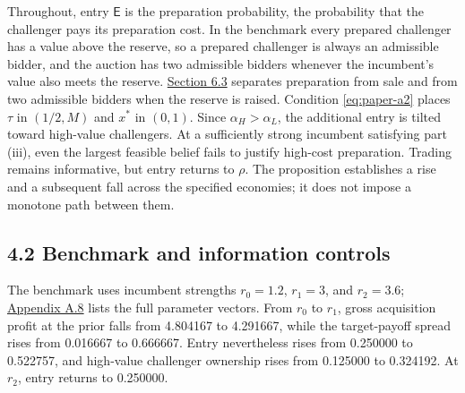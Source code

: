\documentclass[
  12pt,
]{article}
\begin{document}
Throughout, entry \(\mathsf E\) is the preparation probability, the
probability that the challenger pays its preparation cost. In the
benchmark every prepared challenger has a value above the reserve, so a
prepared challenger is always an admissible bidder, and the auction has
two admissible bidders whenever the incumbent's value also meets the
reserve. \hyperref[sec-design]{Section 6.3} separates preparation from
sale and from two admissible bidders when the reserve is raised.
Condition \eqref{eq:paper-a2} places \(\tau\) in \((1/2,M)\) and \(x^*\)
in \((0,1)\). Since \(\alpha_H>\alpha_L\), the additional entry is
tilted toward high-value challengers. At a sufficiently strong incumbent
satisfying part (iii), even the largest feasible belief fails to justify
high-cost preparation. Trading remains informative, but entry returns to
\(\rho\). The proposition establishes a rise and a subsequent fall
across the specified economies; it does not impose a monotone path
between them.

\subsection{4.2 Benchmark and information
controls}\label{sec-benchmark-and-information-controls}

The benchmark uses incumbent strengths \(r_0=1.2\), \(r_1=3\), and
\(r_2=3.6\); \hyperref[pa-parameters]{Appendix A.8} lists the full
parameter vectors. From \(r_0\) to \(r_1\), gross acquisition profit at
the prior falls from 4.804167 to 4.291667, while the target-payoff
spread rises from 0.016667 to 0.666667. Entry nevertheless rises from
0.250000 to 0.522757, and high-value challenger ownership rises from
0.125000 to 0.324192. At \(r_2\), entry returns to 0.250000.

\setcounter{table}{0}
\begin{table}[tbp]\begingroup\singlespacing\small\centering
\caption{Acquisition-stage payoffs in the benchmark.}\label{tab:1}

\par\endgroup\end{table}

\setcounter{table}{1}
\begin{table}[tbp]\begingroup\singlespacing\small\centering
\caption{Equilibrium outcomes, information controls, and welfare.}\label{tab:2}

\par\endgroup\end{table}
\end{document}
